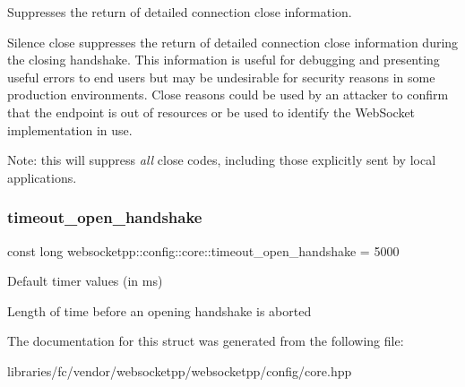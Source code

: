 Suppresses the return of detailed connection close information. 

Silence close suppresses the return of detailed connection close information during the closing handshake. This information is useful for debugging and presenting useful errors to end users but may be undesirable for security reasons in some production environments. Close reasons could be used by an attacker to confirm that the endpoint is out of resources or be used to identify the Web\+Socket implementation in use.

Note\+: this will suppress {\itshape all} close codes, including those explicitly sent by local applications. \mbox{\label{structwebsocketpp_1_1config_1_1core_a48b8736d5603bf1b629c1aff75939515}} 
\subsubsection{\texorpdfstring{timeout\+\_\+open\+\_\+handshake}{timeout\_open\_handshake}}
{\footnotesize\ttfamily const long websocketpp\+::config\+::core\+::timeout\+\_\+open\+\_\+handshake = 5000\hspace{0.3cm}{\ttfamily [static]}}



Default timer values (in ms) 

Length of time before an opening handshake is aborted 

The documentation for this struct was generated from the following file\+:\begin{DoxyCompactItemize}
\item 
libraries/fc/vendor/websocketpp/websocketpp/config/core.\+hpp\end{DoxyCompactItemize}

